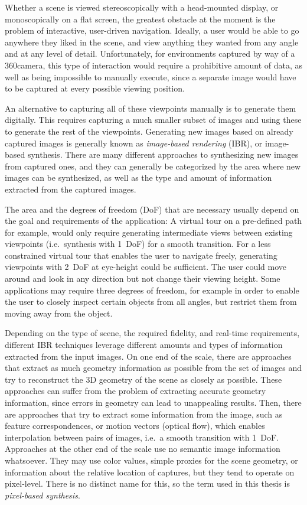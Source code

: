 Whether a scene is viewed stereoscopically with a head-mounted display, or monoscopically on a flat screen, the greatest obstacle at the moment is the problem of interactive, user-driven navigation. Ideally, a user would be able to go anywhere they liked in the scene, and view anything they wanted from any angle and at any level of detail. Unfortunately, for environments captured by way of a 360\degree camera, this type of interaction would require a prohibitive amount of data, as well as being impossible to manually execute, since a separate image would have to be captured at every possible viewing position.

An alternative to capturing all of these viewpoints manually is to generate them digitally. This requires capturing a much smaller subset of images and using these to generate the rest of the viewpoints. Generating new images based on already captured images is generally known as \emph{image-based rendering} (IBR), or image-based synthesis. There are many different approaches to synthesizing new images from captured ones, and they can generally be categorized by the area where new images can be synthesized, as well as the type and amount of information extracted from the captured images.

The area and the degrees of freedom (DoF) that are necessary usually depend on the goal and requirements of the application: A virtual tour on a pre-defined path for example, would only require generating intermediate views between existing viewpoints (i.e.\ synthesis with 1~DoF) for a smooth transition. For a less constrained virtual tour that enables the user to navigate freely, generating viewpoints with 2~DoF at eye-height could be sufficient. The user could move around and look in any direction but not change their viewing height. Some applications may require three degrees of freedom, for example in order to enable the user to closely inspect certain objects from all angles, but restrict them from moving away from the object.

Depending on the type of scene, the required fidelity, and real-time requirements, different IBR techniques leverage different amounts and types of information extracted from the input images. On one end of the scale, there are approaches that extract as much geometry information as possible from the set of images and try to reconstruct the 3D geometry of the scene as closely as possible. These approaches can suffer from the problem of extracting accurate geometry information, since errors in geometry can lead to unappealing results.
Then, there are approaches that try to extract some information from the image, such as feature correspondences, or motion vectors (optical flow), which enables interpolation between pairs of images, i.e.\ a smooth transition with 1~DoF.
Approaches at the other end of the scale use no semantic image information whatsoever. They may use color values, simple proxies for the scene geometry, or information about the relative location of captures, but they tend to operate on pixel-level. There is no distinct name for this, so the term used in this thesis is \emph{pixel-based synthesis}.


